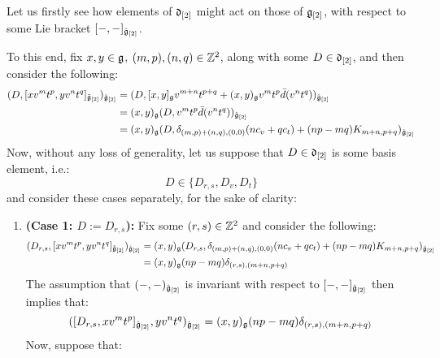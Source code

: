        \begin{remark} \label{remark: derivation_action_on_multiloop_algebras}
            Let us firstly see how elements of $\mathfrak{d}_{[2]}$ might act on those of $\mathfrak{g}_{[2]}$, with respect to some Lie bracket $[-, -]_{\hat{\mathfrak{g}}_{[2]}}$. 

            To this end, fix $x, y \in \mathfrak{g}$, $(m, p), (n, q) \in \mathbb{Z}^2$, along with some $D \in \mathfrak{d}_{[2]}$, and then consider the following:
                $$
                    \begin{aligned}
                        ( D, [x v^m t^p, y v^n t^q]_{\tilde{\mathfrak{g}}_{[2]}} )_{\hat{\mathfrak{g}}_{[2]}} & = ( D, [x, y]_{\mathfrak{g}} v^{m + n} t^{p + q} + (x, y)_{\mathfrak{g}} v^m t^p \bar{d}( v^n t^q ) )_{\hat{\mathfrak{g}}_{[2]}}
                        \\
                        & = (x, y)_{\mathfrak{g}} ( D, v^m t^p \bar{d}( v^n t^q ) )_{\hat{\mathfrak{g}}_{[2]}}
                        \\
                        & = (x, y)_{\mathfrak{g}} ( D, \delta_{(m, p) + (n, q), (0, 0)} ( n c_v + q c_t ) + (np - mq) K_{m + n, p + q} )_{\hat{\mathfrak{g}}_{[2]}}
                    \end{aligned}
                $$
            Now, without any loss of generality, let us suppose that $D \in \mathfrak{d}_{[2]}$ is some basis element, i.e.:
                $$D \in \{ D_{r, s}, D_v, D_t \}$$
            and consider these cases separately, for the sake of clarity:
            \begin{enumerate}
                \item \textbf{(Case 1: $D := D_{r, s}$):} Fix some $(r, s) \in \mathbb{Z}^2$ and consider the following: 
                    $$
                        \begin{aligned}
                            ( D_{r, s}, [x v^m t^p, y v^n t^q]_{\tilde{\mathfrak{g}}_{[2]}} )_{\hat{\mathfrak{g}}_{[2]}} & = (x, y)_{\mathfrak{g}} ( D_{r, s}, \delta_{(m, p) + (n, q), (0, 0)} ( n c_v + q c_t ) + (np - mq) K_{m + n, p + q} )_{\hat{\mathfrak{g}}_{[2]}}
                            \\
                            & = (x, y)_{\mathfrak{g}} (np - mq) \delta_{(r, s), (m + n, p + q)}
                        \end{aligned}
                    $$
                The assumption that $(-, -)_{\hat{\mathfrak{g}}_{[2]}}$ is invariant with respect to $[-, -]_{\hat{\mathfrak{g}}_{[2]}}$ then implies that:
                    $$( [D_{r, s}, x v^m t^p]_{\hat{\mathfrak{g}}_{[2]}}, y v^n t^q )_{\hat{\mathfrak{g}}_{[2]}} = (x, y)_{\mathfrak{g}} (np - mq) \delta_{(r, s), (m + n, p + q)}$$
                Now, suppose that:

\end{enumerate}
\end{remark}
